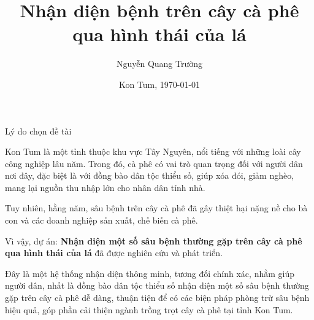 \documentclass{beamer}
\title{Nhận diện bệnh trên cây cà phê\\ qua hình thái của lá}
\author{Nguyễn Quang Trường}
\institute{12 Toán - Trường THPT Chuyên Nguyễn Tất Thành}
\date{Kon Tum, \today}
\begin{document}
\frame{\titlepage}

\begin{frame}[allowframebreaks]{Lý do chọn đề tài}

	Kon Tum là một tỉnh thuộc khu vực Tây Nguyên, nổi tiếng với những loài cây công nghiệp lâu năm. Trong đó, cà phê có vai trò quan trọng đối với người dân nơi đây, đặc biệt là với đồng bào dân tộc thiểu số, giúp xóa đói, giảm nghèo, mang lại nguồn thu nhập lớn cho nhân dân tỉnh nhà.

	\framebreak

	Tuy nhiên, hằng năm, sâu bệnh trên cây cà phê đã gây thiệt hại nặng nề cho bà con và các doanh nghiệp sản xuất, chế biến cà phê.
	
	\framebreak
	
	Vì vậy, dự án: \textbf{Nhận diện một số sâu bệnh thường gặp trên cây cà phê qua hình thái của lá} đã được nghiên cứu và phát triển.
	
	\null
	
	Đây là một hệ thống nhận diện thông minh, tương đối chính xác, nhằm giúp người dân, nhất là đồng bào dân tộc thiểu số nhận diện một số sâu bệnh thường gặp trên cây cà phê dễ dàng, thuận tiện để có các biện pháp phòng trừ sâu bệnh hiệu quả, góp phần cải thiện ngành trồng trọt cây cà phê tại tỉnh Kon Tum.

\end{frame}
\end{document}

